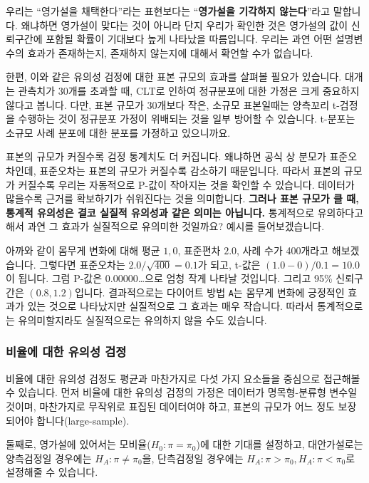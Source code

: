 \documentclass[]{book}
\begin{document}
우리는 ``영가설을 채택한다''라는 표현보다는 ``\textbf{영가설을 기각하지 않는다}''라고 말합니다. 왜냐하면 영가설이 맞다는 것이 아니라 단지 우리가 확인한 것은 영가설의 값이 신뢰구간에 포함될 확률이 기대보다 높게 나타났을 따름입니다. 우리는 과연 어떤 설명변수의 효과가 존재하는지, 존재하지 않는지에 대해서 확언할 수가 없습니다.

한편, 이와 같은 유의성 검정에 대한 표본 규모의 효과를 살펴볼 필요가 있습니다. 대개는 관측치가 30개를 초과할 때, CLT로 인하여 정규분포에 대한 가정은 크게 중요하지 않다고 봅니다. 다만, 표본 규모가 30개보다 작은, 소규모 표본일때는 양측꼬리 t-검정을 수행하는 것이 정규분포 가정이 위배되는 것을 일부 방어할 수 있습니다. t-분포는 소규모 사례 분포에 대한 분포를 가정하고 있으니까요.

표본의 규모가 커질수록 검정 통계치도 더 커집니다. 왜냐하면 공식 상 분모가 표준오차인데, 표준오차는 표본의 규모가 커질수록 감소하기 때문입니다. 따라서 표본의 규모가 커질수록 우리는 자동적으로 P-값이 작아지는 것을 확인할 수 있습니다. 데이터가 많을수록 근거를 확보하기가 쉬워진다는 것을 의미합니다. \textbf{그러나 표본 규모가 클 때, 통계적 유의성은 결코 실질적 유의성과 같은 의미는 아닙니다.} 통계적으로 유의하다고 해서 과연 그 효과가 실질적으로 유의미한 것일까요? 예시를 들어보겠습니다.

아까와 같이 몸무게 변화에 대해 평균 \(1,0\), 표준편차 \(2.0\), 사례 수가 400개라고 해보겠습니다. 그렇다면 표준오차는 \(2.0/\sqrt{400} = 0.1\)가 되고, t-값은 \((1.0 - 0)/0.1 = 10.0\)이 됩니다. 그럼 P-값은 \(0.00000\)\ldots{}으로 엄청 작게 나타날 것입니다. 그리고 95\% 신뢰구간은 \((0.8, 1.2)\)입니다. 결과적으로는 다이어트 방법 \texttt{A}는 몸무게 변화에 긍정적인 효과가 있는 것으로 나타났지만 실질적으로 그 효과는 매우 작습니다. 따라서 통계적으로는 유의미할지라도 실질적으로는 유의하지 않을 수도 있습니다.

\hypertarget{uxbe44uxc728uxc5d0-uxb300uxd55c-uxc720uxc758uxc131-uxac80uxc815}{%
\subsubsection{비율에 대한 유의성 검정}\label{uxbe44uxc728uxc5d0-uxb300uxd55c-uxc720uxc758uxc131-uxac80uxc815}}

비율에 대한 유의성 검정도 평균과 마찬가지로 다섯 가지 요소들을 중심으로 접근해볼 수 있습니다. 먼저 비율에 대한 유의성 검정의 가정은 데이터가 명목형-분류형 변수일 것이며, 마찬가지로 무작위로 표집된 데이터여야 하고, 표본의 규모가 어느 정도 보장되어야 합니다(large-sample).

둘째로, 영가설에 있어서는 모비율(\(H_0: \pi = \pi_0\))에 대한 기대를 설정하고, 대안가설로는 양측검정일 경우에는 \(H_A: \pi \neq \pi_0\)을, 단측검정일 경우에는 \(H_A: \pi > \pi_0, H_A: \pi < \pi_0\)로 설정해줄 수 있습니다.
\end{document}
